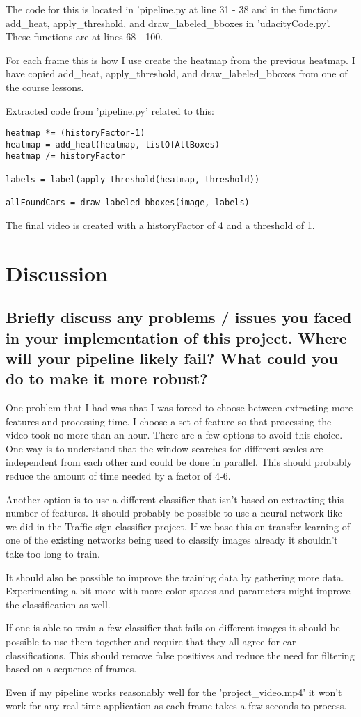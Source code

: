 \documentclass[12pt,a4paper]{article}
\begin{document}
The code for this is located in 'pipeline.py at line 31 - 38 and in the functions add\_heat, apply\_threshold, and draw\_labeled\_bboxes in 'udacityCode.py'. These functions are at lines 68 - 100.

For each frame this is how I use create the heatmap from the previous heatmap. I have copied add\_heat, apply\_threshold, and draw\_labeled\_bboxes from one of the course lessons.

Extracted code from 'pipeline.py' related to this:
\begin{lstlisting}
heatmap *= (historyFactor-1)
heatmap = add_heat(heatmap, listOfAllBoxes)
heatmap /= historyFactor

labels = label(apply_threshold(heatmap, threshold))

allFoundCars = draw_labeled_bboxes(image, labels)
\end{lstlisting}

The final video is created with a historyFactor of 4 and a threshold of 1. 

\section{Discussion}
\subsection{Briefly discuss any problems / issues you faced in your implementation of this project. Where will your pipeline likely fail? What could you do to make it more robust?}

One problem that I had was that I was forced to choose between extracting more features and processing time. I choose a set of feature so that processing the video took no more than an hour. There are a few options to avoid this choice. One way is to understand that the window searches for different scales are independent from each other and could be done in parallel. This should probably reduce the amount of time needed by a factor of 4-6. 

Another option is to use a different classifier that isn't based on extracting this number of features. It should probably be possible to use a neural network like we did in the Traffic sign classifier project. If we base this on transfer learning of one of the existing networks being used to classify images already it shouldn't take too long to train. 

It should also be possible to improve the training data by gathering more data. Experimenting a bit more with more color spaces and parameters might improve the classification as well.

If one is able to train a few classifier that fails on different images it should be possible to use them together and require that they all agree for car classifications. This should remove false positives and reduce the need for filtering based on a sequence of frames.

Even if my pipeline works reasonably well for the 'project\_video.mp4' it won't work for any real time application as each frame takes a few seconds to process.
\end{document}

